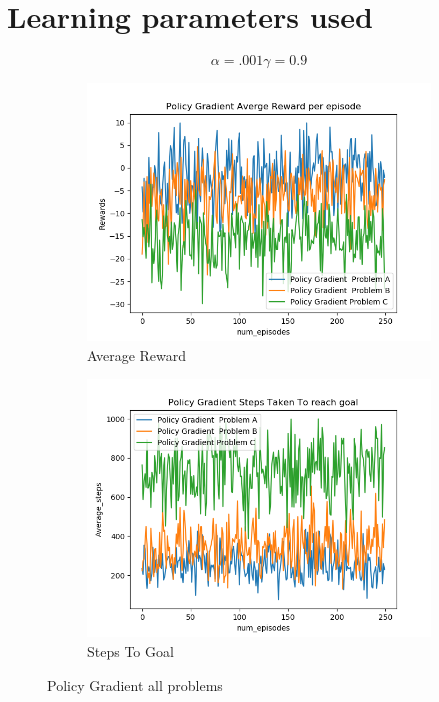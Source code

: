 \documentclass[12pt, letterpaper, twoside]{report}
\begin{document}
\section*{Learning parameters used}
 \[ \alpha  = .001 \gamma = 0.9\]
\begin{figure}[h!]
  \centering
  \begin{subfigure}[b]{0.6\linewidth}
    \includegraphics[width=\linewidth]{Policy_Gradient__rewards.png}
    \caption{Average Reward}
  \end{subfigure}
  \begin{subfigure}[b]{0.6\linewidth}
    \includegraphics[width=\linewidth]{Policy_Gradient__steps.png}
    \caption{Steps To Goal}
  \end{subfigure}
  \caption{Policy Gradient all problems}
  \label{fig:Softamx}
\end{figure}
\end{document}
